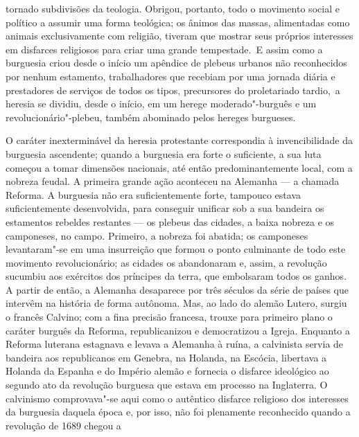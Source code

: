 tornado subdivisões da teologia. Obrigou, portanto, todo o movimento
social e político a assumir uma forma teológica; os ânimos das massas,
alimentadas como animais exclusivamente com religião, tiveram que
mostrar seus próprios interesses em disfarces religiosos para criar uma
grande tempestade. \textbar{}\,E assim como a burguesia criou desde o início um
apêndice de plebeus urbanos não reconhecidos por nenhum estamento,
trabalhadores que recebiam por uma jornada diária e prestadores de
serviços de todos os tipos, precursores do proletariado tardio,\,\textbar{} a
heresia se dividiu, desde o início, em um herege moderado"-burguês e um
revolucionário"-plebeu, também abominado pelos hereges burgueses.

O caráter inexterminável da heresia protestante correspondia à
invencibilidade da burguesia ascendente; quando a burguesia era forte o
suficiente, a sua luta começou a tomar dimensões nacionais, até então %
predominantemente local, com a nobreza feudal. A primeira grande ação
aconteceu na Alemanha --- a chamada Reforma. A burguesia não era
suficientemente forte, tampouco estava suficientemente desenvolvida,
para conseguir unificar sob a sua bandeira os estamentos rebeldes
restantes --- os plebeus das cidades, a baixa nobreza e os camponeses, no %
campo. Primeiro, a nobreza foi abatida; os camponeses levantaram"-se em
uma insurreição que formou o ponto culminante de todo este movimento
revolucionário; as cidades os abandonaram e, assim, a revolução sucumbiu
aos exércitos dos príncipes da terra, que embolsaram todos os ganhos. A
partir de então, a Alemanha desaparece por três séculos da série de
países que intervêm na história de forma autônoma. Mas, ao lado do
alemão Lutero, surgiu o
francês Calvino;
com a fina precisão francesa, trouxe para primeiro plano o caráter
burguês da Reforma, republicanizou e democratizou a Igreja. Enquanto a
Reforma luterana estagnava e levava a Alemanha à ruína, a calvinista
servia de bandeira aos republicanos em Genebra, na Holanda, na Escócia,
libertava a Holanda da Espanha e do Império alemão e fornecia o
disfarce ideológico ao segundo ato da revolução burguesa que estava em
processo na Inglaterra. O calvinismo comprovava"-se aqui como o autêntico
disfarce religioso dos interesses da burguesia daquela época e, por
isso, não foi plenamente reconhecido quando a revolução de 1689 chegou a
